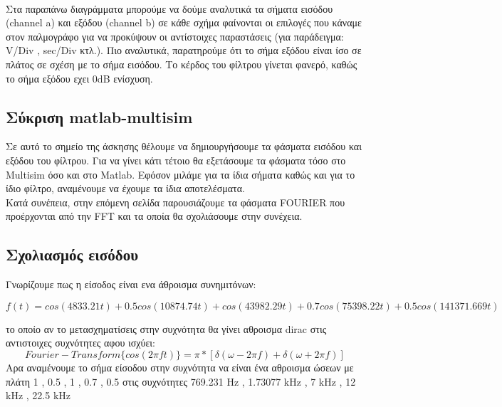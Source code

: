 \documentclass{article}
\begin{document}
{{{\begin{figure}[h!]
\end{figure}   \\[1.4\baselineskip]
Στα παραπάνω διαγράμματα μπορούμε να δούμε αναλυτικά τα σήματα εισόδου (channel a) και εξόδου (channel b) σε κάθε σχήμα φαίνονται οι επιλογές που κάναμε στον παλμογράφο για να προκύψουν οι αντίστοιχες παραστάσεις (για παράδειγμα: V/Div ,  sec/Div κτλ.).
Πιο αναλυτικά, παρατηρούμε ότι το σήμα εξόδου είναι ίσο σε πλάτος σε σχέση με το σήμα εισόδου. Το κέρδος του φίλτρου γίνεται φανερό, καθώς το σήμα εξόδου εχει 0dB ενίσχυση. \clearpage
\subsection*{Σύκριση matlab-multisim}
\large{}
Σε αυτό το σημείο της άσκησης θέλουμε να δημιουργήσουμε τα φάσματα εισόδου και εξόδου του φίλτρου. Για να γίνει κάτι τέτοιο θα εξετάσουμε τα φάσματα τόσο στο Multisim όσο και στο Matlab. Εφόσον μιλάμε για τα ίδια σήματα καθώς και για το ίδιο φίλτρο, αναμένουμε να έχουμε τα ίδια αποτελέσματα. \\[0.4\baselineskip]
Κατά συνέπεια, στην επόμενη σελίδα παρουσιάζουμε τα φάσματα FOURIER που προέρχονται από την FFT και τα οποία θα σχολιάσουμε στην συνέχεια.
\subsection*{Σχολιασμός εισόδου}
Γνωρίζουμε πως η είσοδος είναι ενα άθροισμα συνημιτόνων:
\begin{changemargin}{-2.5cm}{0cm}\begin{equation*}
\boxed{
f(t) = cos(4833.21t) + 0.5 cos(10874.74t) + cos(43982.29t) + 0.7cos(75398.22t) + 0.5cos(141371.669t) }
\end{equation*}
\end{changemargin}
 το οποίο αν το μετασχηματίσεις στην συχνότητα θα γίνει αθροισμα dirac στις αντιστοιχες συχνότητες αφου ισχύει:
\begin{equation*}
\boxed{
Fourier-Transform \{cos(2πft)\} = π * [δ(ω-2πf) + δ(ω+2πf)]}
\end{equation*}
Αρα αναμένουμε το σήμα είσοδου στην συχνότητα να είναι ένα αθροισμα ώσεων με πλάτη 1 , 0.5 , 1 , 0.7 , 0.5 στις συχνότητες  769.231 Hz , 1.73077 kHz , 7 kHz , 12 kHz , 22.5 kHz 
}}}
\end{document}
